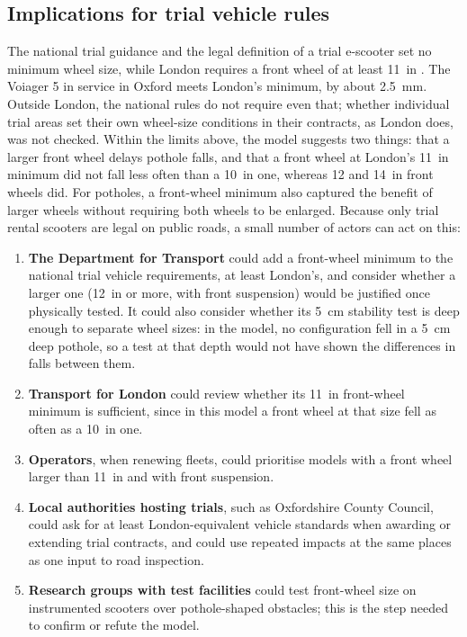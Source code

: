 \subsection{Implications for trial vehicle rules}

The national trial guidance and the legal definition of a trial e-scooter set no minimum
wheel size, while London requires a front wheel of at least 11~in
\autocite{dft2024guidance,si2020_663,tfl2022tender}. The Voiager 5 in service in Oxford meets
London's minimum, by about 2.5~mm. Outside London, the national rules do not require even
that; whether individual trial areas set their own wheel-size conditions in their
contracts, as London does, was not checked. Within the
limits above, the model suggests two things: that a larger front wheel delays pothole falls,
and that a front wheel at London's 11~in minimum did not fall less often than a 10~in one,
whereas 12 and 14~in front wheels did. For potholes, a front-wheel minimum also captured the
benefit of larger wheels without requiring both wheels to be enlarged. Because only trial
rental scooters are legal on public roads, a small number of actors can act on this:

\begin{enumerate}
\item \textbf{The Department for Transport} could add a front-wheel minimum to the national
  trial vehicle requirements, at least London's, and consider whether a larger one (12~in
  or more, with front suspension) would be justified once physically tested. It could also
  consider whether its 5~cm stability test is deep enough to separate wheel sizes: in the
  model, no configuration fell in a 5~cm deep pothole, so a test at that depth would not
  have shown the differences in falls between them.
\item \textbf{Transport for London} could review whether its 11~in front-wheel minimum is
  sufficient, since in this model a front wheel at that size fell as often as a 10~in one.
\item \textbf{Operators}, when renewing fleets, could prioritise models with a front wheel
  larger than 11~in and with front suspension.
\item \textbf{Local authorities hosting trials}, such as Oxfordshire County Council, could ask for
  at least London-equivalent vehicle standards when awarding or extending trial contracts,
  and could use repeated impacts at the same places as one input to road inspection.
\item \textbf{Research groups with test facilities} could test front-wheel size on instrumented
  scooters over pothole-shaped obstacles; this is the step needed to confirm or refute the model.
\end{enumerate}


